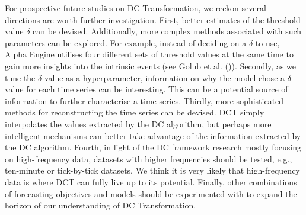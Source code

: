 For prospective future studies on DC Transformation, we reckon several directions are worth further investigation. First, better estimates of the threshold value $\delta$ can be devised. Additionally, more complex methods associated with such parameters can be explored. For example, instead of deciding on a $\delta$ to use, Alpha Engine utilises four different sets of threshold values at the same time to gain more insights into the intrinsic events (see Golub et al. (\citeyear{golub2018alpha})). Secondly, as we tune the $\delta$ value as a hyperparameter, information on why the model chose a $\delta$ value for each time series can be interesting. This can be a potential source of information to further characterise a time series. Thirdly, more sophisticated methods for reconstructing the time series can be devised. DCT simply interpolates the values extracted by the DC algorithm, but perhaps more intelligent mechanisms can better take advantage of the information extracted by the DC algorithm. Fourth, in light of the DC framework research mostly focusing on high-frequency data, datasets with higher frequencies should be tested, e.g., ten-minute or tick-by-tick datasets. We think it is very likely that high-frequency data is where DCT can fully live up to its potential. Finally, other combinations of forecasting objectives and models should be experimented with to expand the horizon of our understanding of DC Transformation.
